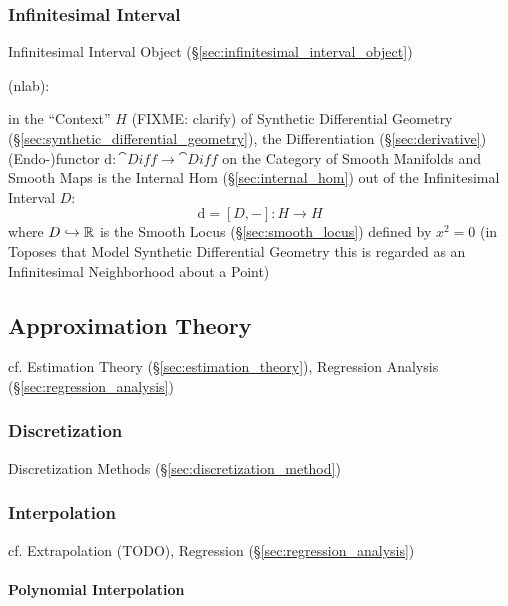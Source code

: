 \subsubsection{Infinitesimal Interval}\label{sec:infinitesimal_interval}

\fist Infinitesimal Interval Object (\S\ref{sec:infinitesimal_interval_object})

(nlab):

in the ``Context'' $H$ (FIXME: clarify) of Synthetic Differential Geometry
(\S\ref{sec:synthetic_differential_geometry}), the Differentiation
(\S\ref{sec:derivative}) (Endo-)functor $\mathrm{d} : \cat{Diff} \rightarrow
\cat{Diff}$ on the Category of Smooth Manifolds and Smooth Maps is the Internal
Hom (\S\ref{sec:internal_hom}) out of the Infinitesimal Interval $D$:
\[
  \mathrm{d} = [D,-] : H \rightarrow H
\]
where $D \hookrightarrow \mathbb{R}$ is the Smooth Locus (\S\ref{sec:smooth_locus})
defined by $x^2 = 0$ (in Toposes that Model Synthetic Differential Geometry this
is regarded as an Infinitesimal Neighborhood about a Point)



\subsection{Approximation Theory}\label{sec:approximation_theory}

\fist cf. Estimation Theory (\S\ref{sec:estimation_theory}), Regression Analysis
(\S\ref{sec:regression_analysis})



\subsubsection{Discretization}\label{sec:discretization}

Discretization Methods (\S\ref{sec:discretization_method})



\subsubsection{Interpolation}\label{sec:interpolation}

cf. Extrapolation (TODO), Regression (\S\ref{sec:regression_analysis})



\paragraph{Polynomial Interpolation}\label{sec:polynomial_interpolation}\hfill

